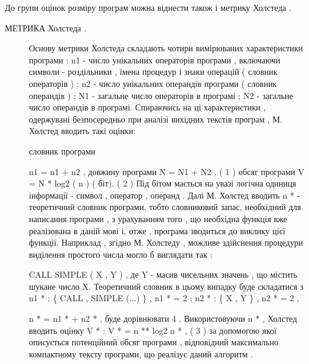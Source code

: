 До групи оцінок розміру програм можна віднести також і метрику Холстеда .
\begin{description}
\item[{МЕТРИКА Холстеда .}] \leavevmode
Основу метрики Холстеда складають чотири вимірюваних характеристики програми :
n1 - число унікальних операторів програми , включаючи символи -
роздільники , імена процедур і знаки операцій ( словник операторів ) ;
n2 - число унікальних операндів програми ( словник операндів ) ;
N1 - загальне число операторів в програмі ;
N2 - загальне число операндів в програмі.
Спираючись на ці характеристики , одержувані безпосередньо при аналізі вихідних текстів програм , М. Холстед вводить такі оцінки:

словник програми

n1 = n1 + n2 ,
довжину програми
N = N1 + N2 , ( 1 )
обсяг програми
V = N * log2 ( n ) ( біт). ( 2 )
Під бітом мається на увазі логічна одиниця інформації - символ , оператор , операнд .
Далі М. Холстед вводить n * - теоретичний словник програми, тобто словниковий запас, необхідний для написання програми , з урахуванням того , що необхідна функція вже реалізована в даній мові і, отже , програма зводиться до виклику цієї функції. Наприклад , згідно М. Холстеду , можливе здійснення процедури виділення простого числа могло б виглядати так :

CALL SIMPLE ( X , Y ) ,
де Y - масив чисельних значень , що містить шукане число X.
Теоретичний словник в цьому випадку буде складатися з
n1 * : \{ CALL , SIMPLE (...) \} ,
n1 * = 2 ; n2 * : \{ X , Y \} ,
n2 * = 2 ,

n * = n1 * + n2 * ,
буде дорівнювати 4 .
Використовуючи n * , Холстед вводить оцінку V * :
V * = n ** log2 n * , ( 3 )
за допомогою якої описується потенційний обсяг програми , відповідний максимально компактному тексту програми, що реалізує даний алгоритм .

\end{description}

